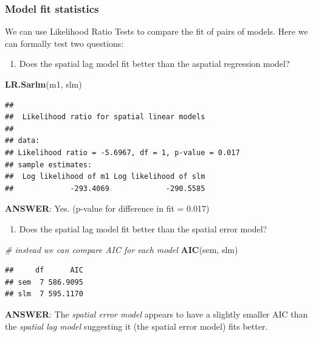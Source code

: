 \documentclass[
]{book}
\newenvironment{Shaded}{\begin{snugshade}}{\end{snugshade}}
\newcommand{\CommentTok}[1]{\textcolor[rgb]{0.56,0.35,0.01}{\textit{#1}}}
\newcommand{\FunctionTok}[1]{\textcolor[rgb]{0.13,0.29,0.53}{\textbf{#1}}}
\newcommand{\NormalTok}[1]{#1}
\providecommand{\tightlist}{%
  \setlength{\itemsep}{0pt}\setlength{\parskip}{0pt}}
\begin{document}
\hypertarget{model-fit-statistics}{%
\subsubsection{Model fit statistics}\label{model-fit-statistics}}

We can use Likelihood Ratio Tests to compare the fit of pairs of models. Here we can formally test two questions:

\begin{enumerate}
\def\labelenumi{\arabic{enumi}.}
\tightlist
\item
  Does the spatial lag model fit better than the aspatial regression model?
\end{enumerate}

\begin{Shaded}
\begin{Highlighting}[]
\FunctionTok{LR.Sarlm}\NormalTok{(m1, slm)}
\end{Highlighting}
\end{Shaded}

\begin{verbatim}
## 
##  Likelihood ratio for spatial linear models
## 
## data:  
## Likelihood ratio = -5.6967, df = 1, p-value = 0.017
## sample estimates:
##  Log likelihood of m1 Log likelihood of slm 
##             -293.4069             -290.5585
\end{verbatim}

\textbf{ANSWER}: Yes. (p-value for difference in fit = 0.017)

\begin{enumerate}
\def\labelenumi{\arabic{enumi}.}
\setcounter{enumi}{1}
\tightlist
\item
  Does the spatial lag model fit better than the spatial error model?
\end{enumerate}

\begin{Shaded}
\begin{Highlighting}[]
\CommentTok{\# instead we can compare AIC for each model}
\FunctionTok{AIC}\NormalTok{(sem, slm)}
\end{Highlighting}
\end{Shaded}

\begin{verbatim}
##     df      AIC
## sem  7 586.9095
## slm  7 595.1170
\end{verbatim}

\textbf{ANSWER}: The \emph{spatial error model} appears to have a slightly smaller AIC than the \emph{spatial lag model} suggesting it (the spatial error model) fits better.
\end{document}
